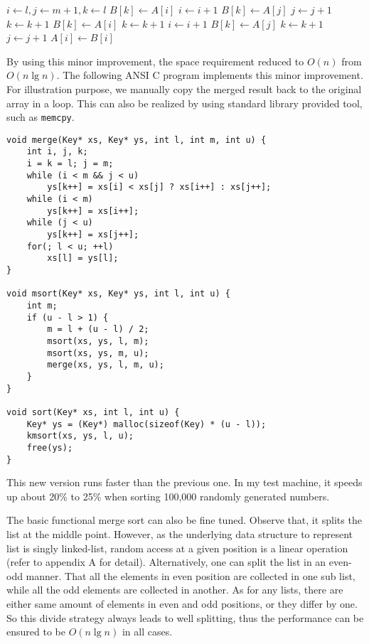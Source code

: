\documentclass[UTF8]{article}
\begin{document}
\begin{algorithmic}[1]
  \State $i \gets l, j \gets m + 1, k \gets l$
      \State $B[k] \gets A[i]$
      \State $i \gets i + 1$
    \Else
      \State $B[k] \gets A[j]$
      \State $j \gets j + 1$
    \EndIf
    \State $k \gets k + 1$
  \EndWhile
    \State $B[k] \gets A[i]$
    \State $k \gets k + 1$
    \State $i \gets i + 1$
  \EndWhile
    \State $B[k] \gets A[j]$
    \State $k \gets k + 1$
    \State $j \gets j + 1$
  \EndWhile
   
    \State $A[i] \gets B[i]$
  \EndFor
\EndProcedure
\end{algorithmic}

By using this minor improvement, the space requirement reduced to $O(n)$ from $O(n \lg n)$.
The following ANSI C program implements this minor improvement. For illustration purpose,
we manually copy the merged result back to the original array in a loop. This can also
be realized by using standard library provided tool, such as \verb|memcpy|.

\lstset{language=C}
\begin{lstlisting}
void merge(Key* xs, Key* ys, int l, int m, int u) {
    int i, j, k;
    i = k = l; j = m;
    while (i < m && j < u)
        ys[k++] = xs[i] < xs[j] ? xs[i++] : xs[j++];
    while (i < m)
        ys[k++] = xs[i++];
    while (j < u)
        ys[k++] = xs[j++];
    for(; l < u; ++l)
        xs[l] = ys[l];
}

void msort(Key* xs, Key* ys, int l, int u) {
    int m;
    if (u - l > 1) {
        m = l + (u - l) / 2;
        msort(xs, ys, l, m);
        msort(xs, ys, m, u);
        merge(xs, ys, l, m, u);
    }
}

void sort(Key* xs, int l, int u) {
    Key* ys = (Key*) malloc(sizeof(Key) * (u - l));
    kmsort(xs, ys, l, u);
    free(ys);
}
\end{lstlisting}

This new version runs faster than the previous one. In my test machine, it speeds up about 20\% to 25\% when sorting
100,000 randomly generated numbers.

The basic functional merge sort can also be fine tuned. Observe that, it splits the list at the middle point. However,
as the underlying data structure to represent list is singly linked-list, random access at a given position is
a linear operation (refer to appendix A for detail). Alternatively, one can split the list in an even-odd manner.
That all the elements in even position are collected in one sub list, while all the odd elements are collected
in another. As for any lists, there are either same amount of elements in even and odd positions, or they
differ by one. So this divide strategy always leads to well splitting, thus the performance can be ensured
to be $O(n \lg n)$ in all cases.
\end{document}
